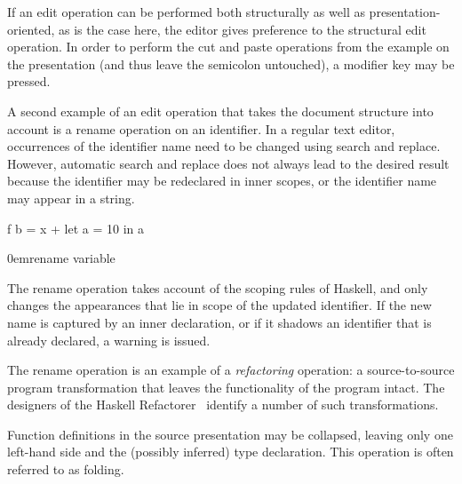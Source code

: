 \documentclass{speauth}
\begin{document}
If an edit operation can be performed both structurally as well as presentation-oriented, as is the case here, the editor gives preference to the structural edit operation. In order to perform the cut and paste operations from the example on the presentation (and thus leave the semicolon untouched), a modifier key may be pressed.



A second example of an edit operation that takes the document structure into account is a rename operation on an identifier. In a regular text editor, occurrences of the identifier name need to be changed using search and replace. However, automatic search and replace does not always lead to the desired result because the identifier may be redeclared in inner scopes, or the identifier name may appear in a string.

{\begin{scriptsize} f  b = x + let a = 10 in a \end{scriptsize}}
{0em}{\small rename variable}

The rename operation takes account of the scoping rules of Haskell, and only changes the appearances that lie in scope of the updated identifier. If the new name is captured by an inner declaration, or if it shadows an identifier that is already declared, a warning is issued.

The rename operation is an example of a {\em refactoring} operation: a source-to-source program transformation that leaves  the functionality of the program intact. The designers of the Haskell Refactorer~\cite{reinke03refactoring} identify a number of such transformations.


Function definitions in the source presentation may be collapsed, leaving only one left-hand side and the (possibly inferred) type declaration. This operation is often referred to as folding.
\vspace*{1.4ex}
\end{document}
